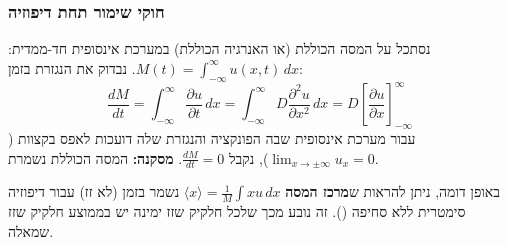 \subsubsection{חוקי שימור תחת דיפוזיה}
נסתכל על המסה הכוללת (או האנרגיה הכוללת) במערכת אינסופית חד-ממדית: $M(t) = \int_{-\infty}^{\infty} u(x,t) \, dx$.
נבדוק את הנגזרת בזמן:
\[
\frac{dM}{dt} = \int_{-\infty}^{\infty} \frac{\partial u}{\partial t} \, dx = \int_{-\infty}^{\infty} D \frac{\partial^2 u}{\partial x^2} \, dx = D \left[ \frac{\partial u}{\partial x} \right]_{-\infty}^{\infty}
\]
עבור מערכת אינסופית שבה הפונקציה והנגזרת שלה דועכות לאפס בקצוות ($\lim_{x\to\pm\infty} u_x = 0$), נקבל $\frac{dM}{dt} = 0$.
\textbf{מסקנה:} המסה הכוללת נשמרת.

באופן דומה, ניתן להראות ש\textbf{מרכז המסה} $\langle x \rangle = \frac{1}{M} \int x u \, dx$ נשמר בזמן (לא זז) עבור דיפוזיה סימטרית ללא סחיפה (). זה נובע מכך שלכל חלקיק שזז ימינה יש בממוצע חלקיק שזז שמאלה.

